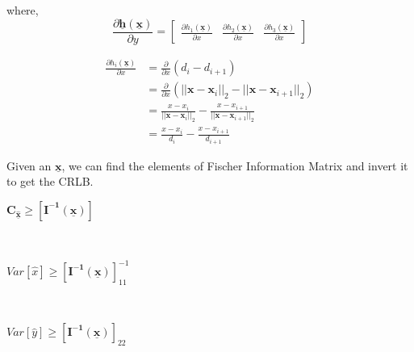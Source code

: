\documentclass[a4 paper]{article}
\begin{document}
where,
\[
\frac{\partial \mathbf{\underline{h}(\mathbf{\underline{x}})}}{\partial y} 
= 
\begin{bmatrix}
\frac{\partial h_{1}(\mathbf{\underline{x}})}{\partial x} & \frac{\partial h_{2}(\mathbf{\underline{x}})}{\partial x} & \frac{\partial h_{3}(\mathbf{\underline{x}})}{\partial x}
\end{bmatrix}
\]

\begin{align*}
\frac{\partial h_{i}(\mathbf{\underline{x}})}{\partial x} &= \frac{\partial}{\partial x} (d_{i} - d_{i+1})
\\ &= \frac{\partial}{\partial x}(||\mathbf{x}-\mathbf{x}_{i}||_{2} - ||\mathbf{x}-\mathbf{x}_{i+1}||_{2} )
\\ &= \frac{x- x_{i}}{||\mathbf{x}-\mathbf{x}_{i}||_{2}} - \frac{x- x_{i+1}}{||\mathbf{x}-\mathbf{x}_{i+1}||_{2}}
\\ &= \frac{x- x_{i}}{d_{i}} - \frac{x- x_{i+1}}{d_{i+1}}
\end{align*}


Given an $\mathbf{\underline{x}}$, we can find the elements of Fischer Information Matrix and invert it to get the CRLB.
\\ \centerline{$ \mathbf{C}_{\mathbf{\hat{\underline{x}}}} \geq [\mathbf{I^{-1}(\mathbf{\underline{x}})}] $}
\\ \centerline{$ Var[{\hat{x}}] \geq [\mathbf{I^{-1}(\mathbf{\underline{x}})}]^{-1}_{11} $}
\\ \centerline{$ Var[{\hat{y}}] \geq [\mathbf{I^{-1}(\mathbf{\underline{x}})}]_{22} $}
\end{document}
